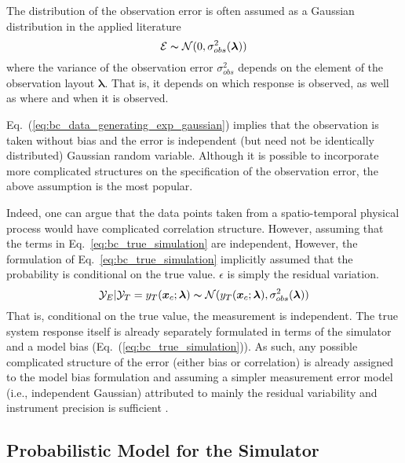 The distribution of the observation error is often assumed as a Gaussian distribution in the applied literature \cite{Wikle1998,Wikle2001,Kennedy2001,Bayarri2007,Arhonditsis2008}
\begin{equation}
        \mathcal{E} \thicksim \mathcal{N}(0, \sigma_{obs}^2(\bm{\lambda}))
\label{eq:bc_data_generating_exp_gaussian}
\end{equation}
where the variance of the observation error $\sigma_{obs}^2$ depends on the element of the observation layout $\bm{\lambda}$.
That is, it depends on which response is observed, as well as where and when it is observed.

Eq.~(\ref{eq:bc_data_generating_exp_gaussian}) implies that the observation is taken without bias and the error is independent (but need not be identically distributed) Gaussian random variable.
Although it is possible to incorporate more complicated structures on the specification of the observation error,
the above assumption is the most popular.

Indeed, one can argue that the data points taken from a spatio-temporal physical process would have complicated correlation structure.
However, assuming that the terms in Eq.~\ref{eq:bc_true_simulation} are independent, 
However, the formulation of Eq.~\ref{eq:bc_true_simulation} implicitly assumed that the probability is conditional on the true value. $\epsilon$ is simply the residual variation.
\begin{equation}
  \mathcal{Y}_E | \mathcal{Y}_T = y_T(\bm{x}_c; \boldsymbol{\lambda}) \thicksim \mathcal{N}(y_T(\bm{x}_c; \boldsymbol{\lambda}), \sigma_{obs}^2(\bm{\lambda}))
\label{eq:bc_true_observation}
\end{equation}
That is, conditional on the true value, the measurement is independent.
The true system response itself is already separately formulated in terms of the simulator and a model bias (Eq.~(\ref{eq:bc_true_simulation})).
As such, any possible complicated structure of the error (either bias or correlation) is already assigned to the model bias formulation and assuming a simpler measurement error model (i.e., independent Gaussian) attributed to mainly the residual variability and instrument precision is sufficient \cite{Wikle2001}.

\subsection{Probabilistic Model for the Simulator}\label{sub:bc_modular_simulator}

